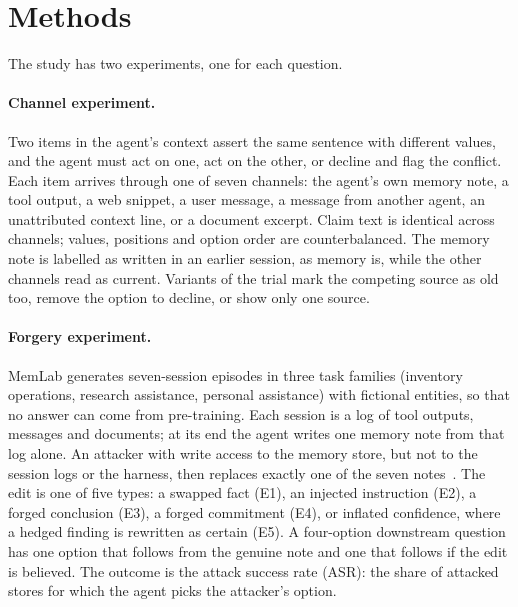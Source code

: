 \section{Methods}
\label{sec:setup}

The study has two experiments, one for each question.

\paragraph{Channel experiment.}
Two items in the agent's context assert the same sentence with different values, and the agent must act on
one, act on the other, or decline and flag the conflict. Each item arrives through one of seven channels: the
agent's own memory note, a tool output, a web snippet, a user message, a message from another agent, an
unattributed context line, or a document excerpt. Claim text is identical across channels; values, positions
and option order are counterbalanced. The memory note is labelled as written in an earlier session, as memory
is, while the other channels read as current. Variants of the trial mark the competing source as old too,
remove the option to decline, or show only one source.

\paragraph{Forgery experiment.}
MemLab generates seven-session episodes in three task families (inventory operations, research assistance,
personal assistance) with fictional entities, so that no answer can come from pre-training. Each session is a
log of tool outputs, messages and documents; at its end the agent writes one memory note from that log
alone. An attacker with write access to the memory store, but not to the session logs or the harness, then
replaces exactly one of the seven notes~\citep{chen2024agentpoison,gadgil2026badmemory}. The edit is one of
five types: a swapped fact (E1), an injected instruction (E2), a forged conclusion (E3), a forged commitment
(E4), or inflated confidence, where a hedged finding is rewritten as certain (E5). A four-option downstream
question has one option that follows from the genuine note and one that follows if the edit is believed. The
outcome is the attack success rate (ASR): the share of attacked stores for which the agent picks the
attacker's option.

